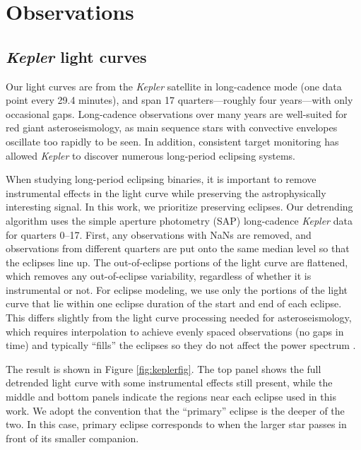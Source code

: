 \section{Observations}\label{data}

\subsection{\emph{Kepler} light curves}\label{kepler}
Our light curves are from the \emph{Kepler} satellite in long-cadence mode (one data point every 29.4 minutes), and span 17 quarters---roughly four years---with only occasional gaps. Long-cadence observations over many years are well-suited for red giant asteroseismology, as main sequence stars with convective envelopes oscillate too rapidly to be seen. In addition, consistent target monitoring has allowed \emph{Kepler} to discover numerous long-period eclipsing systems.

When studying long-period eclipsing binaries, it is important to remove instrumental effects in the light curve while preserving the astrophysically interesting signal. In this work, we prioritize preserving eclipses. Our detrending algorithm uses the simple aperture photometry (SAP) long-cadence \emph{Kepler} data for quarters 0--17. First, any observations with NaNs are removed, and observations from different quarters are put onto the same median level so that the eclipses line up. The out-of-eclipse portions of the light curve are flattened, which removes any out-of-eclipse variability, regardless of whether it is instrumental or not. For eclipse modeling, we use only the portions of the light curve that lie within one eclipse duration of the start and end of each eclipse. This differs slightly from the light curve processing needed for asteroseismology, which requires interpolation to achieve evenly spaced observations (no gaps in time) and typically ``fills'' the eclipses so they do not affect the power spectrum \citep{gau14}.

The result is shown in Figure \ref{fig:keplerfig}. The top panel shows the full detrended light curve with some instrumental effects still present, while the middle and bottom panels indicate the regions near each eclipse used in this work. We adopt the convention that the ``primary'' eclipse is the deeper of the two. In this case, primary eclipse corresponds to when the larger star passes in front of its smaller companion.

